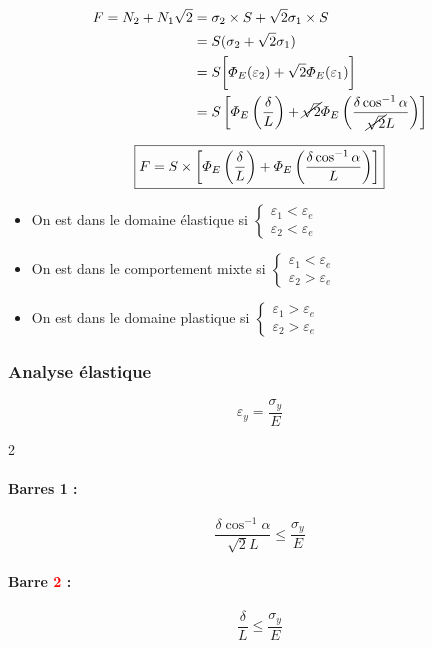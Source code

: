 \documentclass[12pt,a4paper]{report}
\renewcommand{\leq}{\leqslant}
\newcommand{\sgma}[1]{\sigma_{#1}}
\begin{document}
	\vspace{\baselineskip}
	
	\[
	\begin{aligned}
		F = N_{2} + N_{1}\sqrt{2}  &= \sgma{2} \times S + \sqrt{2}\sgma{1} \times S \\
		&= S(\sgma{2} + \sqrt{2}\sgma{1}) \\
		&= S \bigg[ \varPhi_{E}(\varepsilon_{2}) + \sqrt{2}\varPhi_{E}(\varepsilon_{1}) \bigg] \\
		&= S \left[ \varPhi_{E}\left(\dfrac{\delta}{L}\right)  + \cancel{\sqrt{2}}\varPhi_{E}\left(\dfrac{\delta\cos^{-1}\alpha}{\cancel{\sqrt{2}}L}\right) \right]
	\end{aligned}
	\]
	
	\[ \fbox{$F = S \times \left[ \varPhi_{E}\left(\dfrac{\delta}{L}\right)  + \varPhi_{E}\left(\dfrac{\delta\cos^{-1}\alpha}{L}\right) \right]$} \]
	
	
	\begin{itemize}
		\item On est dans le domaine élastique si $\begin{cases}
			\varepsilon_{1} < \varepsilon_{e} \\
			\varepsilon_{2} < \varepsilon_{e}
		\end{cases}$
		
		\item On est dans le comportement mixte si $\begin{cases}
			\varepsilon_{1} < \varepsilon_{e} \\
			\varepsilon_{2} > \varepsilon_{e}
		\end{cases}$
		
		\item On est dans le domaine plastique si $\begin{cases}
			\varepsilon_{1} > \varepsilon_{e} \\
			\varepsilon_{2} > \varepsilon_{e}
		\end{cases}$
	\end{itemize}
	
	
	\subsubsection{Analyse élastique}
	
	\[ \varepsilon_{y} = \dfrac{\sgma{y}}{E} \]
	
	\begin{multicols}{2}
		
		\paragraph{Barres 1 :}
		
		\[ \dfrac{\delta\cos^{-1}\alpha}{\sqrt{2}L} \leq \dfrac{\sgma{y}}{E} \]
		
		\columnbreak
		
		\paragraph{Barre \textcolor{red}{2} :}
		
		\[ \dfrac{\delta}{L} \leq \dfrac{\sgma{y}}{E} \]
		
	\end{multicols}
	
\end{document}
